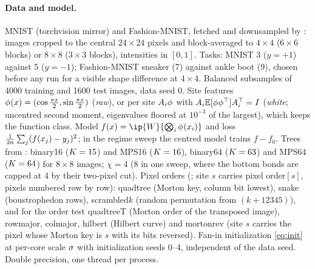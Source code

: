 \paragraph{Data and model.}
MNIST (torchvision mirror) and Fashion-MNIST, fetched and downsampled by : images cropped
to the central $24\times24$ pixels and block-averaged to $4\times4$ ($6\times6$ blocks) or $8\times8$ ($3\times3$ blocks),
intensities in $[0,1]$. Tasks: MNIST 3 ($y=+1$) against 5 ($y=-1$); Fashion-MNIST sneaker (7) against ankle
boot (9), chosen before any run for a visible shape difference at $4\times4$. Balanced subsamples of 4000
training and 1600 test images, data seed 0. Site features $\phi_{}(x)=(\cos\frac{\pi x}2,\sin\frac{\pi x}2)$
(\emph{raw}), or per site $A_i\phi_{}$ with $A_i\mathbb{E}[\phi_{}\phi_{}^{\top}]A_i^{\top}=I$ (\emph{white}; uncentred second moment,
eigenvalues floored at $10^{-3}$ of the largest), which keeps the function class. Model
$f(x)=\ip{\W}{\bigotimes_i\feat{}(x_i)}$ and loss $\frac1{2n}\sum_j(f(x_j)-y_j)^2$; in the regime sweep the
centred model trains $f-f_0$. Trees from : binary16 ($K=15$) and MPS16 ($K=16$),
binary64 ($K=63$) and MPS64 ($K=64$) for $8\times8$ images; $\chi=4$ ($8$ in one sweep, where the bottom bonds
are capped at 4 by their two-pixel cut). Pixel orders (; site $s$ carries pixel
$\mathrm{order}[s]$, pixels numbered row by row): quadtree (Morton key, column bit lowest), snake
(boustrophedon rows), scrambled$k$ (random permutation from $(k+12345)$),
and for the order test quadtreeT (Morton order of the transposed image), rowmajor, colmajor, hilbert
(Hilbert curve) and mortonrev (site $s$ carries the pixel whose Morton key is $s$ with its bits
reversed). Fan-in initialization \eqref{eq:init} at per-core scale $\sigma$ with initialization seeds
0--4, independent of the data seed. Double precision, one thread per process.

